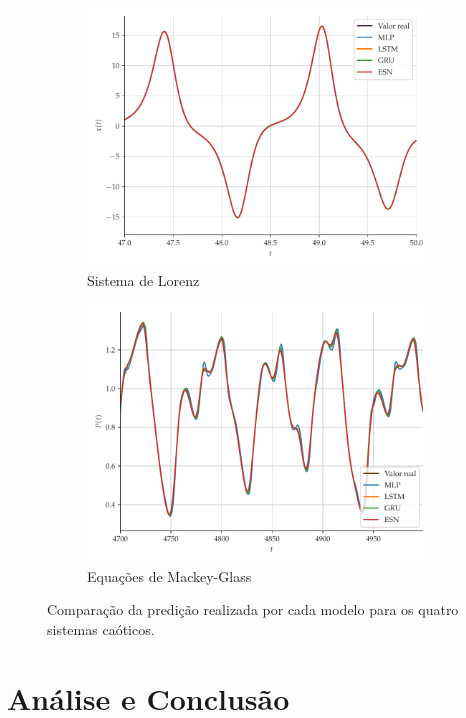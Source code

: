 \documentclass[a4paper, 12pt]{article}
\begin{document}
\begin{figure}[H]
\begin{subfigure}[t]{0.4\textwidth}
         \includegraphics[scale=0.35]{vs-lorenz-zoom.pdf}
         \caption{Sistema de Lorenz}
     \end{subfigure}
     \centering
     \begin{subfigure}[t]{0.4\textwidth}
         \includegraphics[scale=0.35]{vs-mackeyglass-zoom.pdf}
         \caption{Equações de Mackey-Glass}
     \end{subfigure}
     \centering     
     \caption{Comparação da predição realizada por cada modelo para os quatro sistemas caóticos.}
     \label{fig:series-comparison}
\end{figure}


\section{Análise e Conclusão}
\end{document}
